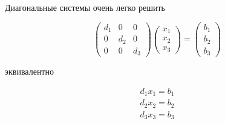 \begin{frame}
    
    \vspace{2em}
    Диагональные системы очень легко решить

    \vspace{0.5em}

    \Eg

    \begin{equation*}
        \begin{pmatrix}
            d_1 & 0  & 0 \\
            0 & d_2 & 0 \\
            0 & 0 & d_3 
        \end{pmatrix}
        \begin{pmatrix}
            x_1  \\
            x_2  \\
            x_3 
        \end{pmatrix}
        =
        \begin{pmatrix}
            b_1  \\
            b_2  \\
            b_3 
        \end{pmatrix}
    \end{equation*}

    эквивалентно

    \begin{equation*}
        \begin{array}{c}
            d_1 x_1  = b_1  \\
            d_2x_2 = b_2 \\
            d_3 x_3 = b_3
        \end{array}
    \end{equation*}

\end{frame}


